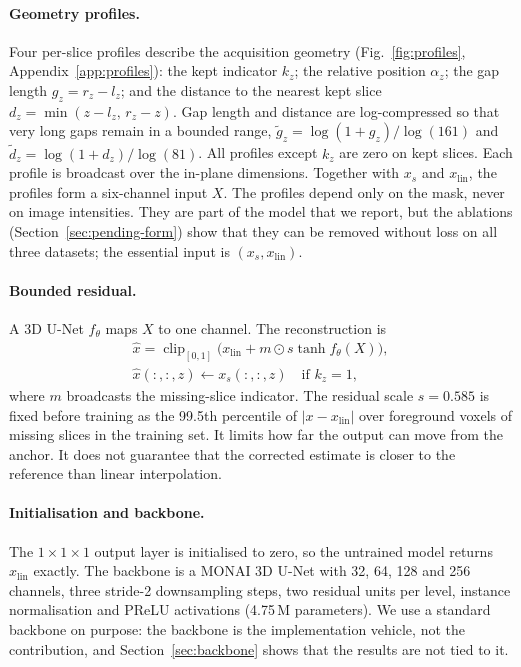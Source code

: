 \documentclass[a4paper,fleqn]{cas-dc}
\begin{document}
\paragraph{Geometry profiles.} Four per-slice profiles describe the acquisition geometry
(Fig.~\ref{fig:profiles}, Appendix~\ref{app:profiles}): the kept indicator $k_z$; the relative position $\alpha_z$; the
gap length $g_z=r_z-l_z$; and the distance to the nearest kept slice
$d_z=\min(z-l_z,\,r_z-z)$. Gap length and distance are log-compressed so that very long gaps
remain in a bounded range, $\tilde g_z=\log(1+g_z)/\log(161)$ and
$\tilde d_z=\log(1+d_z)/\log(81)$. All profiles except $k_z$ are zero on kept slices. Each
profile is broadcast over the in-plane dimensions. Together with $x_s$ and $x_{\mathrm{lin}}$,
the profiles form a six-channel input $X$. The profiles depend only on the mask, never on
image intensities. They are part of the model that we report, but the ablations
(Section~\ref{sec:pending-form}) show that they can be removed without loss on all three
datasets; the essential input is $(x_s, x_{\mathrm{lin}})$.

\paragraph{Bounded residual.} A 3D U-Net $f_\theta$ maps $X$ to one channel. The
reconstruction is
\begin{equation}
\begin{gathered}
\hat x=\operatorname{clip}_{[0,1]}\!\bigl(x_{\mathrm{lin}}+m\odot s\tanh f_\theta(X)\bigr),\\
\hat x(:,:,z)\leftarrow x_s(:,:,z)\quad\text{if } k_z=1,
\end{gathered}
\label{eq:ir3c}
\end{equation}
where $m$ broadcasts the missing-slice indicator. The residual scale $s=0.585$ is fixed
before training as the 99.5th percentile of $|x-x_{\mathrm{lin}}|$ over foreground voxels of
missing slices in the training set. It limits how far the output can move from the anchor.
It does not guarantee that the corrected estimate is closer to the reference than linear
interpolation.

\paragraph{Initialisation and backbone.} The $1\times1\times1$ output layer is initialised to
zero, so the untrained model returns $x_{\mathrm{lin}}$ exactly. The backbone is a MONAI 3D
U-Net \citep{cardoso2022monai} with 32, 64, 128 and 256 channels, three stride-2
downsampling steps, two residual units per level, instance normalisation and PReLU
activations (4.75\,M parameters). We use a standard backbone on purpose: the backbone is the
implementation vehicle, not the contribution, and Section~\ref{sec:backbone} shows that the
results are not tied to it.
\end{document}
